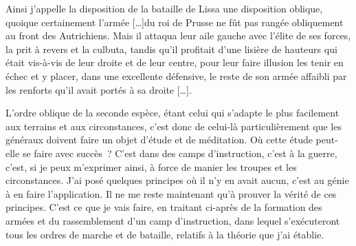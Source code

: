 \documentclass[french,twoside]{book} %
\begin{document}
Ainsi j’appelle la disposition de la bataille de Lissa une disposition oblique, quoique certainement l’armée […]du roi de Prusse ne fût pas rangée obliquement au front des Autrichiens. Mais il attaqua leur aile gauche avec l’élite de ses forces, la prit à revers et la culbuta, tandis qu’il profitait d’une lisière de hauteurs qui était vis-à-vis de leur droite et de leur centre, pour leur faire illusion les tenir en échec et y placer, dans une excellente défensive, le reste de son armée affaibli par les renforts qu’il avait portés à sa droite […].\par
L’ordre oblique de la seconde espèce, étant celui qui s’adapte le plus facilement aux terrains et aux circonstances, c’est donc de celui-là particulièrement que les généraux doivent faire un objet d’étude et de méditation. Où cette étude peut-elle se faire avec succès ? C’est dans des camps d’instruction, c’est à la guerre, c’est, si je peux m’exprimer ainsi, à force de manier les troupes et les circonstances. J’ai posé quelques principes où il n’y en avait aucun, c’est au génie à en faire l’application. Il ne me reste maintenant qu’à prouver la vérité de ces principes. C’est ce que je vais faire, en traitant ci-après de la formation des armées et du rassemblement d’un camp d’instruction, dans lequel s’exécuteront tous les ordres de marche et de bataille, relatifs à la théorie que j’ai établie.
\end{document}
